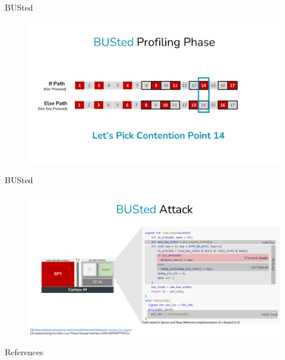 \documentclass{beamer}
\begin{document}
\begin{frame}{BUSted\cite{BUSted}}
\begin{figure}
    \begin{center}
        \includegraphics[width=1\textwidth]{img/busted2.pdf}
    \end{center}
\end{figure} 
\end{frame}

\begin{frame}{BUSted\cite{BUSted}}
\begin{figure}
    \begin{center}
        \includegraphics[width=1\textwidth]{img/busted3.pdf}
    \end{center}
\end{figure} 
\end{frame}

\begin{frame}[allowframebreaks]{References}
\tiny
\printbibliography
\end{frame}
\end{document}
